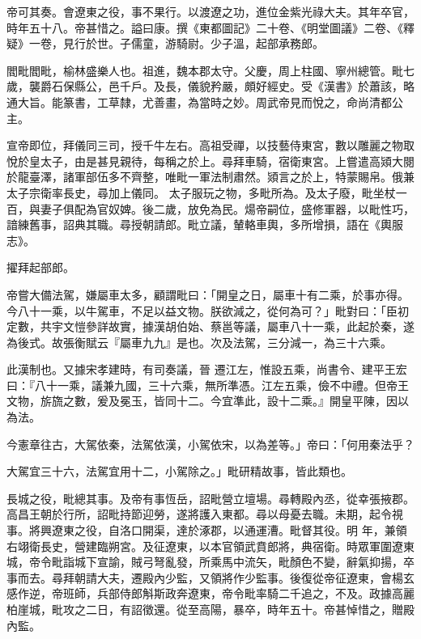 \begin{pinyinscope}
 帝可其奏。會遼東之役，事不果行。以渡遼之功，進位金紫光祿大夫。其年卒官，時年五十八。帝甚惜之。謚曰康。撰《東都圖記》二十卷、《明堂圖議》二卷、《釋疑》一卷，見行於世。子儒童，游騎尉。少子溫，起部承務郎。



 閻毗閻毗，榆林盛樂人也。祖進，魏本郡太守。父慶，周上柱國、寧州總管。毗七歲，襲爵石保縣公，邑千戶。及長，儀貌矜嚴，頗好經史。受《漢書》於蕭該，略通大旨。能篆書，工草隸，尤善畫，為當時之妙。周武帝見而悅之，命尚清都公主。



 宣帝即位，拜儀同三司，授千牛左右。高祖受禪，以技藝侍東宮，數以雕麗之物取悅於皇太子，由是甚見親待，每稱之於上。尋拜車騎，宿衛東宮。上嘗遣高熲大閱於龍臺澤，諸軍部伍多不齊整，唯毗一軍法制肅然。熲言之於上，特蒙賜帛。俄兼太子宗衛率長史，尋加上儀同。
 太子服玩之物，多毗所為。及太子廢，毗坐杖一百，與妻子俱配為官奴婢。後二歲，放免為民。煬帝嗣位，盛修軍器，以毗性巧，諳練舊事，詔典其職。尋授朝請郎。毗立議，輦輅車輿，多所增損，語在《輿服志》。



 擢拜起部郎。



 帝嘗大備法駕，嫌屬車太多，顧謂毗曰：「開皇之日，屬車十有二乘，於事亦得。今八十一乘，以牛駕車，不足以益文物。朕欲減之，從何為可？」毗對曰：「臣初定數，共宇文愷參詳故實，據漢胡伯始、蔡邕等議，屬車八十一乘，此起於秦，遂為後式。故張衡賦云『屬車九九』是也。次及法駕，三分減一，為三十六乘。



 此漢制也。又據宋孝建時，有司奏議，晉
 遷江左，惟設五乘，尚書令、建平王宏曰：『八十一乘，議兼九國，三十六乘，無所準憑。江左五乘，儉不中禮。但帝王文物，旂旒之數，爰及冕玉，皆同十二。今宜準此，設十二乘。』開皇平陳，因以為法。



 今憲章往古，大駕依秦，法駕依漢，小駕依宋，以為差等。」帝曰：「何用秦法乎？



 大駕宜三十六，法駕宜用十二，小駕除之。」毗研精故事，皆此類也。



 長城之役，毗總其事。及帝有事恆岳，詔毗營立壇場。尋轉殿內丞，從幸張掖郡。高昌王朝於行所，詔毗持節迎勞，遂將護入東都。尋以母憂去職。未期，起令視事。將興遼東之役，自洛口開渠，達於涿郡，以通運漕。毗督其役。明
 年，兼領右翊衛長史，營建臨朔宮。及征遼東，以本官領武賁郎將，典宿衛。時眾軍圍遼東城，帝令毗詣城下宣諭，賊弓弩亂發，所乘馬中流矢，毗顏色不變，辭氣抑揚，卒事而去。尋拜朝請大夫，遷殿內少監，又領將作少監事。後復從帝征遼東，會楊玄感作逆，帝班師，兵部侍郎斛斯政奔遼東，帝令毗率騎二千追之，不及。政據高麗柏崖城，毗攻之二日，有詔徵還。從至高陽，暴卒，時年五十。帝甚悼惜之，贈殿內監。




\end{pinyinscope}
